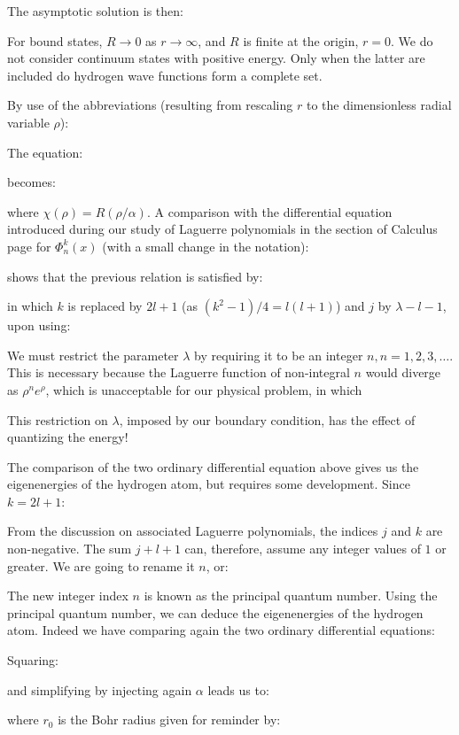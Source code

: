 	The asymptotic solution is then:
	
	For bound states, $R \rightarrow 0$ as $r \rightarrow \infty$, and $R$ is finite at the origin, $r=0$. We do not consider continuum states with positive energy. Only when the latter are included do hydrogen wave functions form a complete set.
	
	By use of the abbreviations (resulting from rescaling $r$ to the dimensionless radial variable $\rho$):
	
	The equation:
	
	becomes:
	
	where $\chi(\rho)=R(\rho / \alpha)$. A comparison with the differential equation introduced during our study of Laguerre polynomials in the section of Calculus page \pageref{radial term dimensionless non-rigid rotator} for $\Phi_{n}^{k}(x)$ (with a small change in the notation):
	
	 shows that the previous relation is satisfied by:
	
	in which $k$ is replaced by $2 l+1$ (as $(k^2-1)/4=l(l+1)$) and $j$ by $\lambda-l-1$, upon using:
	
	We must restrict the parameter $\lambda$ by requiring it to be an integer $n, n=1,2,3, \ldots$. This is necessary because the Laguerre function of non-integral $n$ would diverge as $\rho^{n} e^{\rho}$, which is unacceptable for our physical problem, in which
	
	This restriction on $\lambda$, imposed by our boundary condition, has the effect of quantizing the energy! 
	
	The comparison of the two ordinary differential equation above gives us the eigenenergies of the hydrogen atom, but requires some development. Since $k=2 l+1$:
	
	From the discussion on associated Laguerre polynomials, the indices $j$ and $k$ are non-negative. The sum $j+l+1$ can, therefore, assume any integer values of $1$ or greater. We are going to rename it $n$, or:
	
	The new integer index $n$ is known as the principal quantum number. Using the principal quantum number, we can deduce the eigenenergies of the hydrogen atom. Indeed we have comparing again the two ordinary differential equations:
	
	Squaring:
	
	and simplifying by injecting again $\alpha$ leads us to:
	
	where $r_0$ is the Bohr radius given for reminder by:
	
